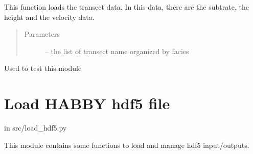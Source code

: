\documentclass[letterpaper,10pt,english]{sphinxmanual}
\begin{document}
\begin{fulllineitems}
\label{\detokenize{index:src.lammi.load_transect_data}}
This function loads the transect data. In this data, there are the subtrate, the height and the velocity data.
\begin{quote}\begin{description}
\item[{Parameters}] \leavevmode
{} -- the list of transect name organized by facies

\end{description}\end{quote}

\end{fulllineitems}


\begin{fulllineitems}
\label{\detokenize{index:src.lammi.main}}
Used to test this module

\end{fulllineitems}



\section{Load HABBY hdf5 file}
\label{\detokenize{index:load-habby-hdf5-file}}
in src/load\_hdf5.py

This module contains some functions to load and manage hdf5 input/outputs.
\label{\detokenize{index:module-src.load_hdf5}}
\end{document}
